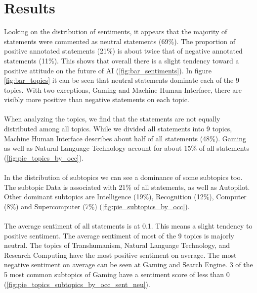 \section{Results}
Looking on the distribution of sentiments, it appears that the majority of statements were commented as neutral statements (69\%). The proportion of positive annotated statements (21\%) is about twice that of negative annotated statements (11\%). This shows that overall there is a slight tendency toward a positive attitude on the future of AI (\autoref{fig:bar_sentiments}). In figure \ref{fig:bar_topics} it can be seen that neutral statements dominate each of the 9 topics. With two exceptions, Gaming and Machine Human Interface, there are visibly more positive than negative statements on each topic. 
\\
\\
When analyzing the topics, we find that the statements are not equally distributed among all topics. While we divided all statements into 9 topics, Machine Human Interface describes about half of all statements (48\%). Gaming as well as Natural Language Technology account for about 15\% of all statements (\autoref{fig:pie_topics_by_occ}). 
\\
\\
In the distribution of subtopics we can see a dominance of some subtopics too. The subtopic Data is associated with 21\% of all statements, as well as Autopilot. Other dominant subtopics are Intelligence (19\%), Recognition (12\%), Computer (8\%) and Supercomputer (7\%) (\autoref{fig:pie_subtopics_by_occ}). 
\\
\\
The average sentiment of all statements is at 0.1. This means a slight tendency to positive sentiment. The average sentiment of most of the 9 topics is majorly neutral. The topics of Transhumanism, Natural Language Technology, and Research Computing have the most positive sentiment on average. The most negative sentiment on average can be seen at Gaming and Search Engine. 3 of the 5 most common subtopics of Gaming have a sentiment score of less than 0 (\autoref{fig:pie_topics_subtopics_by_occ_sent_neu}). 